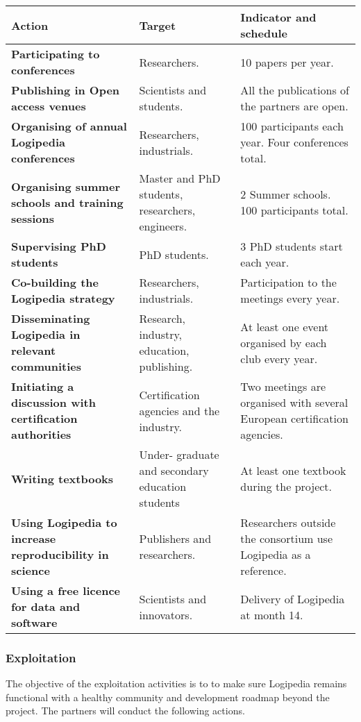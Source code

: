 \begin{longtable*}{|p{0.35\textwidth}|p{0.22\textwidth}|p{0.25\textwidth}|}
\hline
{\bf Action}
&
{\bf Target}
&
{\bf Indicator and schedule}
\\
\hline
{\bf Participating to conferences}
&
Researchers.
&
10 papers per year.
\\
\hline
{\bf Publishing in Open access venues}
&
Scientists and students.
&
All the publications of the partners are open.
\\
\hline
{\bf Organising of annual Logipedia conferences}
&
Researchers, industrials.
&
100 participants each year. Four conferences total.
\\
\hline
{\bf Organising summer schools and training sessions}
&
Master and PhD students, researchers, engineers.
&
2 Summer schools. 100 participants total.
\\
\hline
    {\bf Supervising PhD students} 
&
PhD students.
&
3 PhD students start each year.
\\
\hline
{\bf Co-building the Logipedia strategy}
&
Researchers, industrials.
&
Participation to the meetings
every year.
\\
\hline
{\bf Disseminating Logipedia in relevant communities}
&
Research, industry,
education, publishing.
&
At least one event organised by each club every year.
\\
\hline
{\bf Initiating a discussion with certification authorities}
&
Certification agencies and the industry. 
&
Two meetings are organised with several European certification agencies.
\\
\hline
{\bf Writing textbooks}
&
Under- graduate and secondary education students
&
At least one textbook during the project.
\\
\hline
{\bf Using Logipedia to increase reproducibility in science}
&
Publishers and researchers.
&
Researchers outside the consortium use Logipedia as a reference.
\\
\hline
{\bf Using a free licence for data and software} 
&
Scientists and innovators.
&
Delivery of Logipedia at month 14.
\\
\hline
\end{longtable*}

\subsubsection*{Exploitation}

The objective of the exploitation activities is to
to make sure Logipedia remains functional with a
healthy community and development roadmap beyond the project.
The partners will conduct the following actions.

